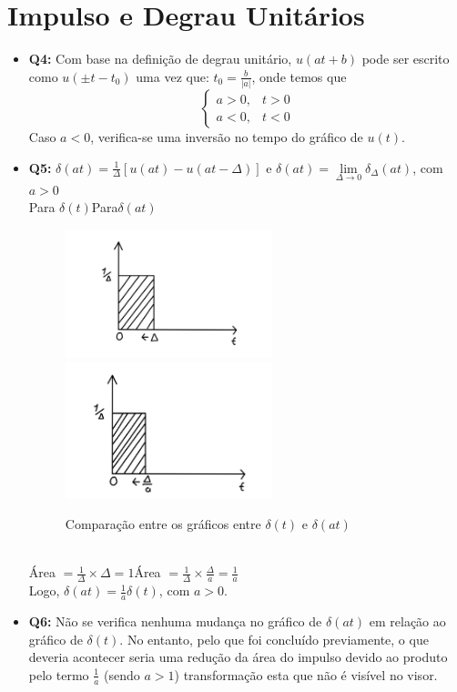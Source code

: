 \documentclass[a4paper, 12pt]{article}
\begin{document}
\section{Impulso e Degrau Unitários}
\begin{itemize}
    \item \textbf{Q4:} Com base na definição de degrau unitário, $u(at+b)$ pode ser escrito como $u(\pm t - t_0)$ uma vez que: $t_0 = \frac{b}{|a|}$, onde temos que
          \[ \begin{cases}
                  a > 0, & t > 0 \\
                  a < 0, & t < 0
              \end{cases} \]
          Caso $a < 0$, verifica-se uma inversão no tempo do gráfico de $u(t)$.
          \newpage
    \item \textbf{Q5:} $\delta(at) = \frac{1}{\Delta}[u(at) - u(at - \Delta)]$ e $\delta(at) = \underset{{\Delta\to0}}{\lim}\delta_\Delta(at)$, com $a > 0$\vspace{15px}\\
          Para $\delta(t)$\hspace{150px}Para$\delta(at)$\\
          \begin{figure}[!ht]
              \includegraphics[width=6cm]{images/Graf1.png}
              \hspace{10px}
              \includegraphics[width=6cm]{images/Graf2.png}
              \vspace{-10px}
              \caption{Comparação entre os gráficos entre $\delta(t) \textrm{ e } \delta(at)$}
          \end{figure}\\
          Área $ = \frac{1}{\Delta}\times\Delta = 1$\hspace{100px}Área $= \frac{1}{\Delta} \times \frac{\Delta}{a} = \frac{1}{a}$\vspace{15px}\\
          Logo, $\delta(at) = \frac{1}{a}\delta(t)$, com $a > 0$.\vspace{5px}
    \item \textbf{Q6:} Não se verifica nenhuma mudança no gráfico de $\delta(at)$ em relação ao gráfico de $\delta(t)$. No entanto, pelo que foi concluído previamente, o que deveria acontecer seria uma redução da área do impulso devido ao produto pelo termo $\frac{1}{a}$ (sendo $a > 1$) transformação esta que não é visível no visor.
\end{itemize}
\end{document}
